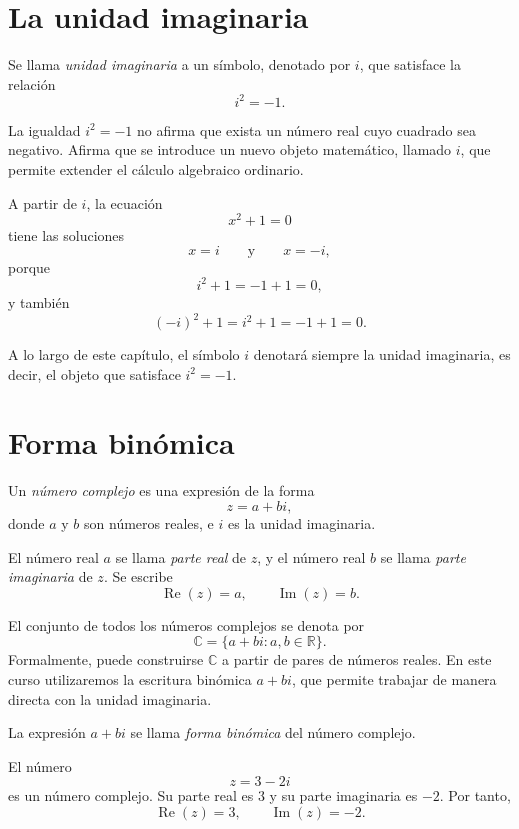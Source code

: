 \section{La unidad imaginaria}

\begin{definicion}
Se llama \emph{unidad imaginaria} a un símbolo, denotado por \(i\), que satisface la relación
\[
  i^2=-1.
\]
\end{definicion}

La igualdad \(i^2=-1\) no afirma que exista un número real cuyo cuadrado sea negativo. Afirma que se introduce un nuevo objeto matemático, llamado \(i\), que permite extender el cálculo algebraico ordinario.

A partir de \(i\), la ecuación
\[
  x^2+1=0
\]
tiene las soluciones
\[
  x=i \qquad \text{y} \qquad x=-i,
\]
porque
\[
  i^2+1=-1+1=0,
\]
y también
\[
  (-i)^2+1=i^2+1=-1+1=0.
\]

\begin{convencion}
A lo largo de este capítulo, el símbolo \(i\) denotará siempre la unidad imaginaria, es decir, el objeto que satisface \(i^2=-1\).
\end{convencion}

\section{Forma binómica}

\begin{definicion}
Un \emph{número complejo} es una expresión de la forma
\[
  z=a+bi,
\]
donde \(a\) y \(b\) son números reales, e \(i\) es la unidad imaginaria.

El número real \(a\) se llama \emph{parte real} de \(z\), y el número real \(b\) se llama \emph{parte imaginaria} de \(z\). Se escribe
\[
  \operatorname{Re}(z)=a,
  \qquad
  \operatorname{Im}(z)=b.
\]
\end{definicion}

El conjunto de todos los números complejos se denota por
\[
  \mathbb{C}=\{a+bi: a,b\in\mathbb{R}\}.
\]
Formalmente, puede construirse \(\mathbb{C}\) a partir de pares de números reales. En este curso utilizaremos la escritura binómica \(a+bi\), que permite trabajar de manera directa con la unidad imaginaria.

La expresión \(a+bi\) se llama \emph{forma binómica} del número complejo.

\begin{ejemplo}
El número
\[
  z=3-2i
\]
es un número complejo. Su parte real es \(3\) y su parte imaginaria es \(-2\). Por tanto,
\[
  \operatorname{Re}(z)=3,
  \qquad
  \operatorname{Im}(z)=-2.
\]
\end{ejemplo}

